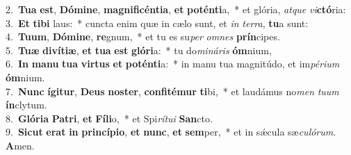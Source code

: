 {2.~}\textbf{Tu}\textbf{a} \textbf{est}, \textbf{Dó}\textbf{mi}\textbf{ne}, \textbf{ma}\textbf{gni}\textbf{fi}\textbf{cén}\textbf{ti}\textbf{a}, \textbf{et} \textbf{po}\textbf{tén}\textbf{ti}a,~* et glória, \textit{at}\textit{que} \textit{vi}\textbf{ctó}ria:\\
{3.~}\textbf{Et} \textbf{ti}\textbf{bi} laus:~* cuncta enim quæ in cælo sunt, et \textit{in} \textit{ter}\textit{ra}, \textbf{tu}a sunt:\\
{4.~}\textbf{Tu}\textbf{um}, \textbf{Dó}\textbf{mi}\textbf{ne}, \textbf{re}gnum,~* et tu es su\textit{per} \textit{om}\textit{nes} \textbf{prín}cipes.\\
{5.~}\textbf{Tu}\textbf{æ} \textbf{di}\textbf{ví}\textbf{ti}\textbf{æ}, \textbf{et} \textbf{tu}\textbf{a} \textbf{est} \textbf{gló}\textbf{ri}a:~* tu do\textit{mi}\textit{ná}\textit{ris} \textbf{óm}nium,\\
{6.~}\textbf{In} \textbf{ma}\textbf{nu} \textbf{tu}\textbf{a} \textbf{vir}\textbf{tus} \textbf{et} \textbf{po}\textbf{tén}\textbf{ti}a:~* in manu tua magnitúdo, et im\textit{pé}\textit{ri}\textit{um} \textbf{óm}nium.\\
{7.~}\textbf{Nunc} \textbf{í}\textbf{gi}\textbf{tur}, \textbf{De}\textbf{us} \textbf{no}\textbf{ster}, \textbf{con}\textbf{fi}\textbf{té}\textbf{mur} \textbf{ti}bi,~* et laudámus no\textit{men} \textit{tu}\textit{um} \textbf{ín}clytum.\\
{8.~}\textbf{Gló}\textbf{ri}\textbf{a} \textbf{Pa}\textbf{tri}, \textbf{et} \textbf{Fí}\textbf{li}o,~* et Spi\textit{rí}\textit{tu}\textit{i} \textbf{San}cto.\\
{9.~}\textbf{Si}\textbf{cut} \textbf{e}\textbf{rat} \textbf{in} \textbf{prin}\textbf{cí}\textbf{pi}\textbf{o}, \textbf{et} \textbf{nunc}, \textbf{et} \textbf{sem}per,~* et in sǽcula sæ\textit{cu}\textit{ló}\textit{rum}. \textbf{A}men.\\
